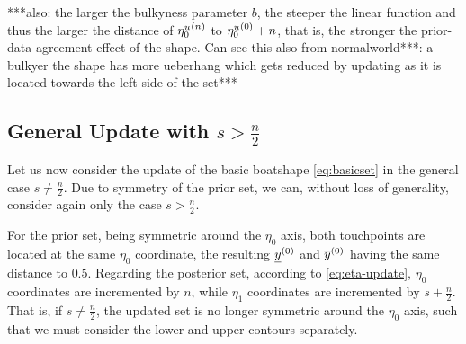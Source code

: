 ***also: the larger the bulkyness parameter $b$, the steeper the linear function
and thus the larger the distance of ${\eta_0^u}^{(n)}$ to ${\eta_0^u}^{(0)} + n$,
that is, the stronger the prior-data agreement effect of the shape.
Can see this also from normalworld***: a bulkyer the shape has more ueberhang
which gets reduced by updating as it is located towards the left side of the set***

\subsection{General Update with \texorpdfstring{$s > \frac{n}{2}$}{s > n/2}}
\label{sec:generalupdate}

Let us now consider the update of the basic boatshape \eqref{eq:basicset} %
in the general case $s \neq \frac{n}{2}$.
Due to symmetry of the prior set, we can, without loss of generality,
consider again only the case $s > \frac{n}{2}$.

For the prior set, being symmetric around the $\eta_0$ axis,
both touchpoints are located at the same $\eta_0$ coordinate,
the resulting $\underline{y}^{(0)}$ and $\overline{y}^{(0)}$ having the same distance to $0.5$.
Regarding the posterior set, according to \eqref{eq:eta-update},
$\eta_0$ coordinates are incremented by $n$, while
$\eta_1$ coordinates are incremented by $s+\frac{n}{2}$.
That is, if $s \neq \frac{n}{2}$, the updated set is no longer symmetric around the $\eta_0$ axis,
such that we must consider the lower and upper contours separately.


